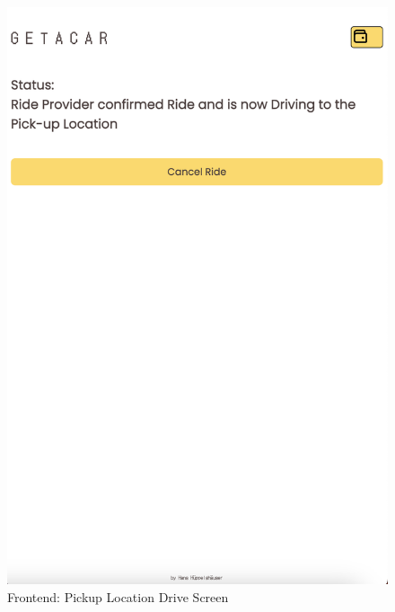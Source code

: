 \begin{figure}[h]
    \centering
    
    \begin{minipage}{0.45\linewidth}
        \centering
        \includegraphics[width=\linewidth]{data/ffss/7.png}
        \caption{Frontend: Pickup Location Drive Screen}
        \label{fig:PickupLocationDriveScreen}
    \end{minipage}
    \hfill
    \begin{minipage}{0.45\linewidth}
        \centering

\end{minipage}
\end{figure}
